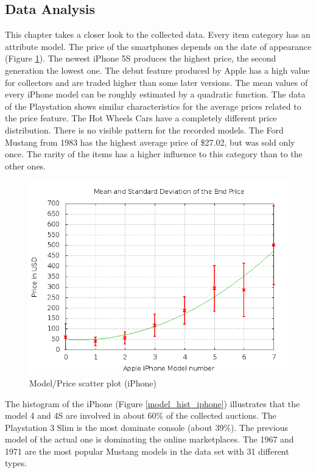 \subsection{Data Analysis}
This chapter takes a closer look to the collected data. Every item category has an attribute model. The price of the smartphones depends on the date of appearance (Figure \ref{model_price_iphone}). The newest iPhone 5S produces the highest price, the second generation the lowest one. The debut feature produced by Apple has a high value for collectors and are traded higher than some later versions. The mean values of every iPhone model can be roughly estimated by a quadratic function. The data of the Playstation shows similar characteristics for the average prices related to the price feature. The Hot Wheels Cars have a completely different price distribution. There is no visible pattern for the recorded models. The Ford Mustang from 1983 has the highest average price of \$27.02, but was sold only once. The rarity of the items has a higher influence to this category than to the other ones.\\
\begin{figure}
\centering
\includegraphics[scale=0.5]{images/plots/iphone/price_model_iphone.png}
\caption{Model/Price scatter plot (iPhone)}
\label{model_price_iphone}
\end{figure}
The histogram of the iPhone (Figure \ref{model_hist_iphone}) illustrates that the model 4 and 4S are involved in about 60\% of the collected auctions. The Playstation 3 Slim is the most dominate console (about 39\%). The previous model of the actual one is dominating the online marketplaces. The 1967 and 1971 are the most popular Mustang models in the data set with 31 different types.\\
